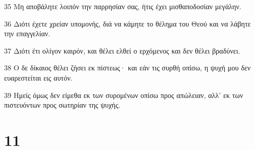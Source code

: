 \par 35 Μη αποβάλητε λοιπόν την παρρησίαν σας, ήτις έχει μισθαποδοσίαν μεγάλην.
\par 36 Διότι έχετε χρείαν υπομονής, διά να κάμητε το θέλημα του Θεού και να λάβητε την επαγγελίαν.
\par 37 Διότι έτι ολίγον καιρόν, και θέλει ελθεί ο ερχόμενος και δεν θέλει βραδύνει.
\par 38 Ο δε δίκαιος θέλει ζήσει εκ πίστεως· και εάν τις συρθή οπίσω, η ψυχή μου δεν ευαρεστείται εις αυτόν.
\par 39 Ημείς όμως δεν είμεθα εκ των συρομένων οπίσω προς απώλειαν, αλλ' εκ των πιστευόντων προς σωτηρίαν της ψυχής.

\chapter{11}


